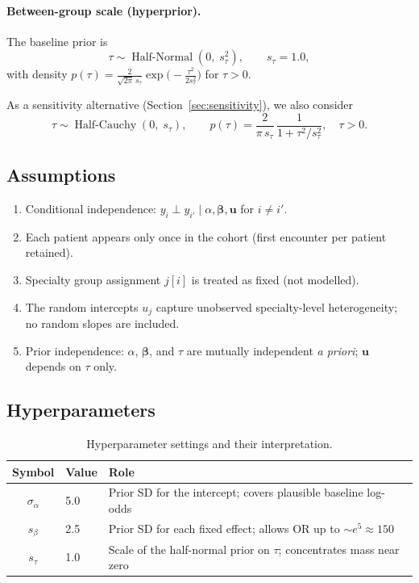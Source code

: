 \documentclass[11pt]{article}
\newcommand{\bbeta}{\bm{\beta}}
\newcommand{\bu}{\bm{u}}
\DeclareMathOperator{\HalfNormal}{Half\text{-}Normal}
\DeclareMathOperator{\HalfCauchy}{Half\text{-}Cauchy}
\begin{document}
\paragraph{Between-group scale (hyperprior).}
The baseline prior is
\begin{equation}\label{eq:prior-tau-hn}
  \tau \sim \HalfNormal(0,\;s_\tau^2),
  \qquad s_\tau = 1.0,
\end{equation}
with density
$p(\tau) = \frac{2}{\sqrt{2\pi}\,s_\tau}\exp\!\bigl(-\tfrac{\tau^2}{2s_\tau^2}\bigr)$
for $\tau > 0$.

As a sensitivity alternative (Section~\ref{sec:sensitivity}), we also consider
\begin{equation}\label{eq:prior-tau-hc}
  \tau \sim \HalfCauchy(0,\;s_\tau),
  \qquad
  p(\tau) = \frac{2}{\pi\,s_\tau}\,
  \frac{1}{1 + \tau^2 / s_\tau^2},
  \quad \tau > 0.
\end{equation}

\subsection{Assumptions}
\begin{enumerate}[label=(\roman*)]
  \item Conditional independence: $y_i \perp y_{i'} \mid \alpha, \bbeta, \bu$ for $i \neq i'$.
  \item Each patient appears only once in the cohort (first encounter per patient retained).
  \item Specialty group assignment $j[i]$ is treated as fixed (not modelled).
  \item The random intercepts $u_j$ capture unobserved specialty-level heterogeneity; no random slopes are included.
  \item Prior independence: $\alpha$, $\bbeta$, and $\tau$ are mutually independent \textit{a priori}; $\bu$ depends on $\tau$ only.
\end{enumerate}

\subsection{Hyperparameters}

\begin{table}[h]
\centering
\begin{tabular}{cll}
\toprule
Symbol & Value & Role \\
\midrule
$\sigma_\alpha$ & 5.0 & Prior SD for the intercept; covers plausible baseline log-odds \\
$s_\beta$ & 2.5 & Prior SD for each fixed effect; allows OR up to $\sim e^{5} \approx 150$ \\
$s_\tau$ & 1.0 & Scale of the half-normal prior on $\tau$; concentrates mass near zero \\
\bottomrule
\end{tabular}
\caption{Hyperparameter settings and their interpretation.}
\label{tab:hyperparams}
\end{table}
\end{document}
